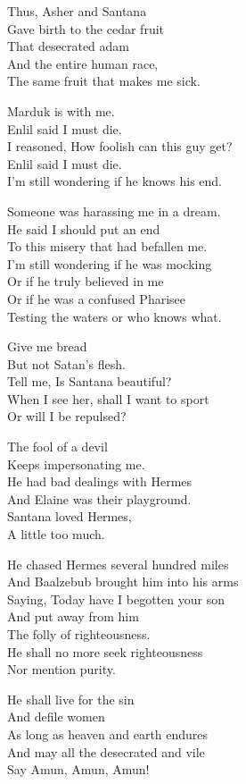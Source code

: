 \documentclass[
]{book}
\begin{document}
Thus, Asher and Santana\\
Gave birth to the cedar fruit\\
That desecrated adam\\
And the entire human race,\\
The same fruit that makes me sick.

Marduk is with me.\\
Enlil said I must die.\\
I reasoned, How foolish can this guy get?\\
Enlil said I must die.\\
I'm still wondering if he knows his end.

Someone was harassing me in a dream.\\
He said I should put an end\\
To this misery that had befallen me.\\
I'm still wondering if he was mocking\\
Or if he truly believed in me\\
Or if he was a confused Pharisee\\
Testing the waters or who knows what.

Give me bread\\
But not Satan's flesh.\\
Tell me, Is Santana beautiful?\\
When I see her, shall I want to sport\\
Or will I be repulsed?

The fool of a devil\\
Keeps impersonating me.\\
He had bad dealings with Hermes\\
And Elaine was their playground.\\
Santana loved Hermes,\\
A little too much.

He chased Hermes several hundred miles\\
And Baalzebub brought him into his arms\\
Saying, Today have I begotten your son\\
And put away from him\\
The folly of righteousness.\\
He shall no more seek righteousness\\
Nor mention purity.

He shall live for the sin\\
And defile women\\
As long as heaven and earth endures\\
And may all the desecrated and vile\\
Say Amun, Amun, Amun!
\end{document}
